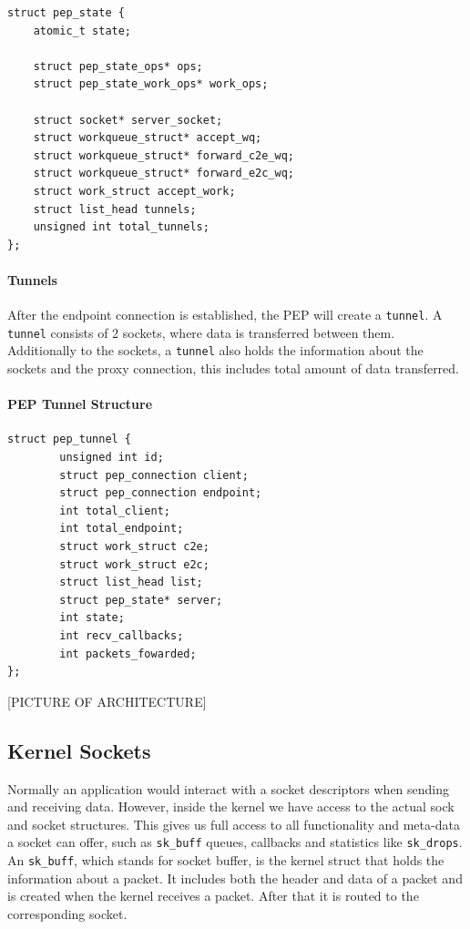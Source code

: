 \documentclass[a4paper,english, 11pt]{report}
\begin{document}
\noindent\begin{minipage}{\linewidth}
\begin{verbatim}
struct pep_state {
    atomic_t state;
    
    struct pep_state_ops* ops;
    struct pep_state_work_ops* work_ops;
    
    struct socket* server_socket;
    struct workqueue_struct* accept_wq;
    struct workqueue_struct* forward_c2e_wq;
    struct workqueue_struct* forward_e2c_wq;
    struct work_struct accept_work;
    struct list_head tunnels;
    unsigned int total_tunnels;
};
\end{verbatim}
\label{fig:pep_state_structure}
\end{minipage}

\paragraph{Tunnels}
After the endpoint connection is established, the PEP will create a \verb|tunnel|. A \verb|tunnel| consists of 2 sockets, where data is transferred between them. Additionally to the sockets, a \verb|tunnel| also holds the information about the sockets and the proxy connection, this includes total amount of data transferred.\\

\noindent\begin{minipage}{\linewidth}
\paragraph{PEP Tunnel Structure}
\begin{verbatim}
struct pep_tunnel {
        unsigned int id;
        struct pep_connection client;
        struct pep_connection endpoint;
        int total_client;
        int total_endpoint;
        struct work_struct c2e;
        struct work_struct e2c;
        struct list_head list;
        struct pep_state* server;
        int state;
        int recv_callbacks;
        int packets_fowarded;
};
\end{verbatim}
\end{minipage}

[PICTURE OF ARCHITECTURE]\\

\subsection{Kernel Sockets}
Normally an application would interact with a socket descriptors when sending and receiving data. However, inside the kernel we have access to the actual sock and socket structures. This gives us full access to all functionality and meta-data a socket can offer, such as \verb|sk_buff| queues, callbacks and statistics like \verb|sk_drops|. An \verb|sk_buff|, which stands for socket buffer, is the kernel struct that holds the information about a packet. It includes both the header and data of a packet and is created when the kernel receives a packet. After that it is routed to the corresponding socket.\\
\end{document}
